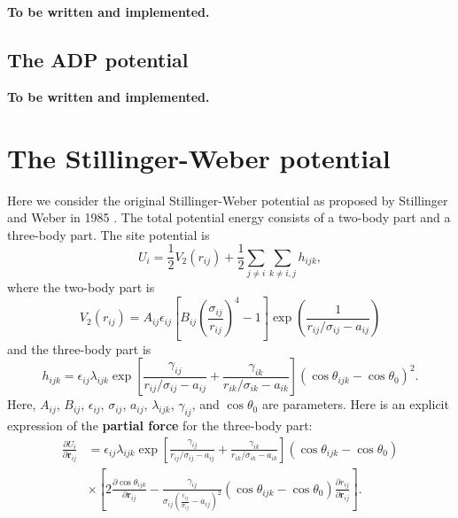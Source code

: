 \documentclass[12pt,a4paper]{report}
\newcommand{\vect}[1]{\boldsymbol{#1}}
\begin{document}
\textbf{To be written and implemented.}

\subsection{The ADP potential}

\textbf{To be written and implemented.}

\section{The Stillinger-Weber potential}

Here we consider the original Stillinger-Weber potential as proposed by Stillinger and Weber in 1985 \cite{stillinger1985prb}.
The total potential energy consists of a two-body part and a three-body part. The site potential is
\begin{equation}
U_i = \frac{1}{2} V_2(r_{ij}) + \frac{1}{2}\sum_{j\neq i}\sum_{k\neq i,j} h_{ijk},
\end{equation}
where the two-body part is
\begin{equation}
V_2(r_{ij}) =  A_{ij} \epsilon_{ij}
\left[
  B_{ij} \left( \frac{\sigma_{ij} }{ r_{ij} } \right)^{4}-1
\right]
\exp\left(   \frac{1}{ r_{ij} / \sigma_{ij} - a_{ij}} \right)
\end{equation}
and the three-body part is
\begin{equation}
h_{ijk}=\epsilon_{ij}\lambda_{ijk}
\exp
\left[
\frac{\gamma_{ij}}{r_{ij}/\sigma_{ij}-a_{ij}} + \frac{\gamma_{ik}}{r_{ik}/\sigma_{ik}-a_{ik}}
\right]
         \left(\cos \theta_{ijk} - \cos \theta_{0} \right)^2.
\end{equation}
Here, $A_{ij}$, $B_{ij}$, $\epsilon_{ij}$, $\sigma_{ij}$, $a_{ij}$, $\lambda_{ijk}$, $\gamma_{ij}$, and $\cos \theta_{0}$ are parameters. Here is an explicit expression of the \textbf{partial force} for the three-body part:
\begin{align}
\frac{\partial U_i}{\partial \vect{r}_{ij}}
&= \epsilon_{ij}\lambda_{ijk} \exp \left[
 \frac{\gamma_{ij}}{r_{ij}/\sigma_{ij}-a_{ij}} + \frac{\gamma_{ik}}{r_{ik}/\sigma_{ik}-a_{ik}}
\right] \left(\cos \theta_{ijk} - \cos \theta_{0} \right) \nonumber \\
&\times
\left[
  2 \frac{\partial \cos \theta_{ijk}} {\partial \vect{r}_{ij}} -
  \frac{\gamma_{ij}}{\sigma_{ij} \left( \frac{r_{ij}}{\sigma_{ij}} - a_{ij} \right)^2}
  \left(\cos \theta_{ijk} - \cos \theta_{0} \right)
  \frac{\partial r_{ij}} {\partial \vect{r}_{ij}}
\right].
\end{align}
\end{document}
